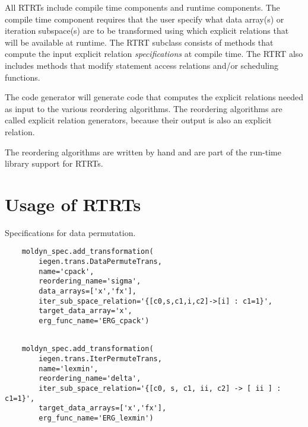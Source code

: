 \documentclass{article}
\begin{document}
All RTRTs include compile time components and runtime components.  The compile time component requires that the user specify what data array(s) or iteration subspace(s) are to be transformed using which explicit relations that will be available at runtime.  The RTRT subclass consists of methods that compute the input explicit relation {\em specifications} at compile time.  The RTRT also includes methods that modify statement access relations and/or scheduling functions.

The code generator will generate code that computes the explicit relations needed as input to the various reordering algorithms.  The reordering algorithms are called explicit relation generators, because their output is also an explicit relation.


The reordering algorithms are written by hand and are part of the run-time library support for RTRTs.

\section{Usage of RTRTs}


Specifications for data permutation. %

\begin{verbatim}
    moldyn_spec.add_transformation(
        iegen.trans.DataPermuteTrans,
        name='cpack',
        reordering_name='sigma',
        data_arrays=['x','fx'],
        iter_sub_space_relation='{[c0,s,c1,i,c2]->[i] : c1=1}',
        target_data_array='x',
        erg_func_name='ERG_cpack')
    
\end{verbatim}

\begin{verbatim}
    moldyn_spec.add_transformation(
        iegen.trans.IterPermuteTrans,
        name='lexmin',
        reordering_name='delta',
        iter_sub_space_relation='{[c0, s, c1, ii, c2] -> [ ii ] : c1=1}',
        target_data_arrays=['x','fx'],
        erg_func_name='ERG_lexmin')  
\end{verbatim}
    
\end{document}
